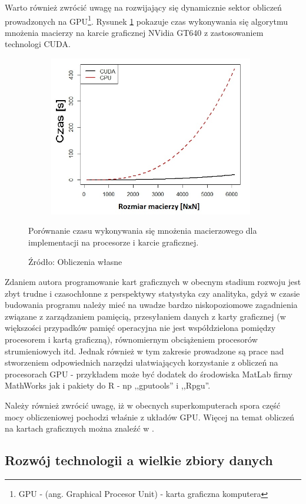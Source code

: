 \documentclass[man,mfu]{mgrwms}
\begin{document}
Warto również zwrócić uwagę na rozwijający się dynamicznie sektor obliczeń prowadzonych na GPU\footnote{GPU - (ang. Graphical Procesor Unit) - karta graficzna komputera}. Rysunek \ref{cuda} pokazuje czas wykonywania się algorytmu mnożenia macierzy na karcie graficznej NVidia GT640 z zastosowaniem technologi CUDA.    

\begin{figure}[H]
\centering
\includegraphics[width=110mm,height = 70mm]{cpuvsgpu}
\caption{Porównanie czasu wykonywania się mnożenia macierzowego dla implementacji na procesorze i karcie graficznej.}
\caption*{Źródło: Obliczenia własne}
\label{cuda}
\end{figure}

Zdaniem autora programowanie kart graficznych w obecnym stadium rozwoju jest zbyt trudne i czasochłonne z perspektywy statystyka czy analityka, gdyż w czasie budowania programu należy mieć na uwadze bardzo niskopoziomowe zagadnienia związane z zarządzaniem pamięcią, przesyłaniem danych z karty graficznej (w większości przypadków pamięć operacyjna nie jest współdzielona pomiędzy procesorem i kartą graficzną), równomiernym obciążeniem procesorów strumieniowych itd. Jednak również w tym zakresie prowadzone są prace nad stworzeniem odpowiednich narzędzi ułatwiających korzystanie z obliczeń na procesorach GPU - przykładem może być dodatek do środowiska MatLab firmy MathWorks\cite{matgpu} jak i pakiety do R - np ,,gputools'' i ,,Rpgu''. 

Należy również zwrócić uwagę, iż w obecnych superkomputerach spora część mocy obliczeniowej pochodzi właśnie z układów GPU. Więcej na temat obliczeń na kartach graficznych można znaleźć w \cite{sanders2011}\cite{kirk2010}.

\subsection{Rozwój technologii a wielkie zbiory danych}
\end{document}
